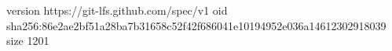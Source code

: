 version https://git-lfs.github.com/spec/v1
oid sha256:86e2ae2bf51a28ba7b31658c52f42f686041e10194952e036a14612302918039
size 1201
